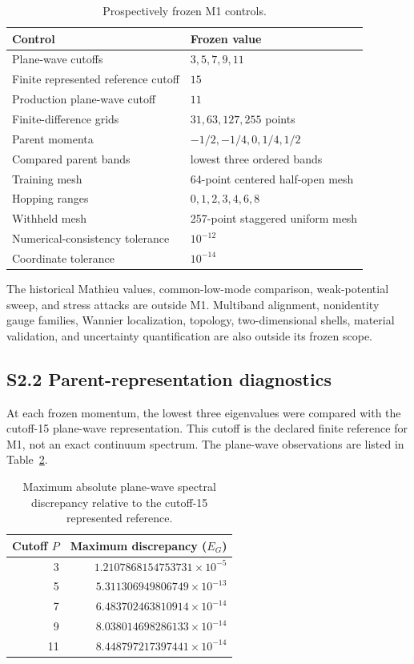 \begin{table}[ht]
\centering
\caption{Prospectively frozen M1 controls.}
\label{tab:supp-m1-controls}
\begin{tabular}{@{}ll@{}}
\toprule
Control & Frozen value \\
\midrule
Plane-wave cutoffs & $3,5,7,9,11$ \\
Finite represented reference cutoff & $15$ \\
Production plane-wave cutoff & $11$ \\
Finite-difference grids & $31,63,127,255$ points \\
Parent momenta & $-1/2,-1/4,0,1/4,1/2$ \\
Compared parent bands & lowest three ordered bands \\
Training mesh & 64-point centered half-open mesh \\
Hopping ranges & $0,1,2,3,4,6,8$ \\
Withheld mesh & 257-point staggered uniform mesh \\
Numerical-consistency tolerance & $10^{-12}$ \\
Coordinate tolerance & $10^{-14}$ \\
\bottomrule
\end{tabular}
\end{table}

The historical Mathieu values, common-low-mode comparison, weak-potential
sweep, and stress attacks are outside M1. Multiband alignment, nonidentity gauge
families, Wannier localization, topology, two-dimensional shells, material
validation, and uncertainty quantification are also outside its frozen scope.

\subsection*{S2.2 Parent-representation diagnostics}

At each frozen momentum, the lowest three eigenvalues were compared with the
cutoff-15 plane-wave representation. This cutoff is the declared finite
reference for M1, not an exact continuum spectrum. The plane-wave observations
are listed in Table~\ref{tab:supp-m1-plane-wave}.

\begin{table}[ht]
\centering
\caption{Maximum absolute plane-wave spectral discrepancy relative to the
cutoff-15 represented reference.}
\label{tab:supp-m1-plane-wave}
\begin{tabular}{@{}rr@{}}
\toprule
Cutoff $P$ & Maximum discrepancy ($E_G$) \\
\midrule
3  & $1.2107868154753731\times10^{-5}$ \\
5  & $5.311306949806749\times10^{-13}$ \\
7  & $6.483702463810914\times10^{-14}$ \\
9  & $8.038014698286133\times10^{-14}$ \\
11 & $8.448797217397441\times10^{-14}$ \\
\bottomrule
\end{tabular}
\end{table}

